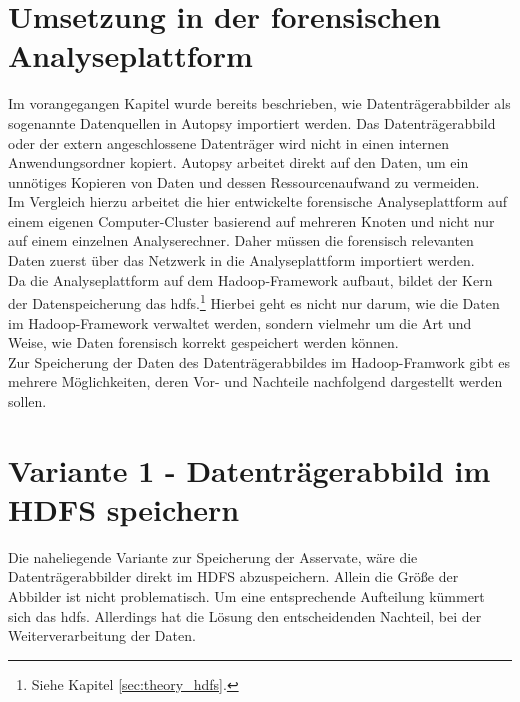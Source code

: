\section{Umsetzung in der forensischen Analyseplattform}

Im vorangegangen Kapitel wurde bereits beschrieben, wie Datenträgerabbilder als sogenannte Datenquellen in Autopsy importiert werden. Das Datenträgerabbild oder der extern angeschlossene Datenträger wird nicht in einen internen Anwendungsordner kopiert. Autopsy arbeitet direkt auf den Daten, um ein unnötiges Kopieren von Daten und dessen Ressourcenaufwand zu vermeiden. \\

\noindent
Im Vergleich hierzu arbeitet die hier entwickelte forensische Analyseplattform auf einem eigenen Computer-Cluster basierend auf mehreren Knoten und nicht nur auf einem einzelnen Analyserechner. Daher müssen die forensisch relevanten Daten zuerst über das Netzwerk in die Analyseplattform importiert werden. \\
Da die Analyseplattform auf dem Hadoop-Framework aufbaut, bildet der Kern der Datenspeicherung das \gls{hdfs}.\footnote{Siehe Kapitel \ref{sec:theory_hdfs}.} Hierbei geht es nicht nur darum, wie die Daten im Hadoop-Framework verwaltet werden, sondern vielmehr um die Art und Weise, wie Daten forensisch korrekt gespeichert werden können.\\


\noindent
Zur Speicherung der Daten des Datenträgerabbildes im Hadoop-Framwork gibt es mehrere Möglichkeiten, deren Vor- und Nachteile nachfolgend dargestellt werden sollen.

\section{Variante 1 - Datenträgerabbild im HDFS speichern}
\label{sec:variant1}

Die naheliegende Variante zur Speicherung der Asservate, wäre die Datenträgerabbilder direkt im HDFS abzuspeichern. Allein die Größe der Abbilder ist nicht problematisch. Um eine entsprechende Aufteilung kümmert sich das \gls{hdfs}. Allerdings hat die Lösung den entscheidenden Nachteil, bei der Weiterverarbeitung der Daten.\\ 

